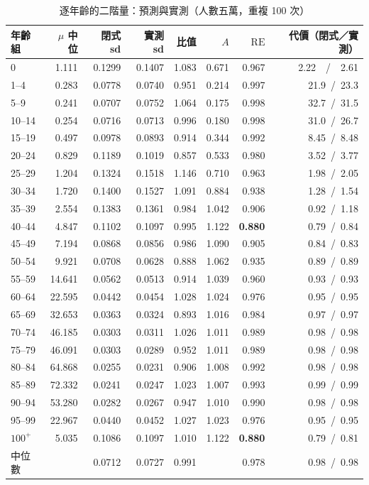 \documentclass[UTF8, fontset=macnew, a4paper, 12pt]{ctexart}
\begin{document}
\begin{table}[H]
\centering
\caption{逐年齡的二階量：預測與實測（人數五萬，重複 100 次）}
\small
\begin{tabular}{lrrrrrrr}
\toprule
年齡組 & $\mu$ 中位 & 閉式 sd & 實測 sd & 比值 & $A$ & $\mathrm{RE}$
 & 代價（閉式／實測）\\
\midrule
0        & 1.111  & 0.1299 & 0.1407 & 1.083 & 0.671 & 0.967 & 2.22\ \ /\ \ 2.61\\
1--4     & 0.283  & 0.0778 & 0.0740 & 0.951 & 0.214 & 0.997 & 21.9\ /\ 23.3\\
5--9     & 0.241  & 0.0707 & 0.0752 & 1.064 & 0.175 & 0.998 & 32.7\ /\ 31.5\\
10--14   & 0.254  & 0.0716 & 0.0713 & 0.996 & 0.180 & 0.998 & 31.0\ /\ 26.7\\
15--19   & 0.497  & 0.0978 & 0.0893 & 0.914 & 0.344 & 0.992 & 8.45\ /\ 8.48\\
20--24   & 0.829  & 0.1189 & 0.1019 & 0.857 & 0.533 & 0.980 & 3.52\ /\ 3.77\\
25--29   & 1.204  & 0.1324 & 0.1518 & 1.146 & 0.710 & 0.963 & 1.98\ /\ 2.05\\
30--34   & 1.720  & 0.1400 & 0.1527 & 1.091 & 0.884 & 0.938 & 1.28\ /\ 1.54\\
35--39   & 2.554  & 0.1383 & 0.1361 & 0.984 & 1.042 & 0.906 & 0.92\ /\ 1.18\\
40--44   & 4.847  & 0.1102 & 0.1097 & 0.995 & 1.122 & \textbf{0.880} & 0.79\ /\ 0.84\\
45--49   & 7.194  & 0.0868 & 0.0856 & 0.986 & 1.090 & 0.905 & 0.84\ /\ 0.83\\
50--54   & 9.921  & 0.0708 & 0.0628 & 0.888 & 1.062 & 0.935 & 0.89\ /\ 0.89\\
55--59   & 14.641 & 0.0562 & 0.0513 & 0.914 & 1.039 & 0.960 & 0.93\ /\ 0.93\\
60--64   & 22.595 & 0.0442 & 0.0454 & 1.028 & 1.024 & 0.976 & 0.95\ /\ 0.95\\
65--69   & 32.653 & 0.0363 & 0.0324 & 0.893 & 1.016 & 0.984 & 0.97\ /\ 0.97\\
70--74   & 46.185 & 0.0303 & 0.0311 & 1.026 & 1.011 & 0.989 & 0.98\ /\ 0.98\\
75--79   & 46.091 & 0.0303 & 0.0289 & 0.952 & 1.011 & 0.989 & 0.98\ /\ 0.98\\
80--84   & 64.868 & 0.0255 & 0.0231 & 0.906 & 1.008 & 0.992 & 0.98\ /\ 0.98\\
85--89   & 72.332 & 0.0241 & 0.0247 & 1.023 & 1.007 & 0.993 & 0.99\ /\ 0.99\\
90--94   & 53.280 & 0.0282 & 0.0267 & 0.947 & 1.010 & 0.990 & 0.98\ /\ 0.98\\
95--99   & 22.967 & 0.0440 & 0.0452 & 1.027 & 1.023 & 0.976 & 0.95\ /\ 0.95\\
$100^{+}$& 5.035  & 0.1086 & 0.1097 & 1.010 & 1.122 & \textbf{0.880} & 0.79\ /\ 0.81\\
\midrule
中位數    &        & 0.0712 & 0.0727 & 0.991 &       & 0.978 & 0.98\ /\ 0.98\\
\bottomrule
\end{tabular}
\label{tab:v2}
\end{table}
\end{document}
